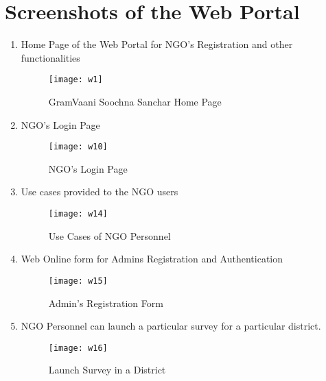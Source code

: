 \chapter{Screenshots of the Web Portal}

\begin{enumerate}
\item Home Page of the Web Portal for NGO's Registration and other functionalities
\begin{figure}[here]
\begin{center}   
\texttt{[image: w1]}
\caption{GramVaani Soochna Sanchar Home Page}
\label{fig:w1}
\end{center}
\end{figure}


\item NGO's Login Page
\begin{figure}[here]
\begin{center}   
\texttt{[image: w10]}
\caption{NGO's Login Page}
\label{fig:w10}
\end{center}
\end{figure}



\item Use cases provided to the NGO users
\begin{figure}[here]
\begin{center}   
\texttt{[image: w14]}
\caption{Use Cases of NGO Personnel}
\label{fig:w14}
\end{center}
\end{figure}



\item Web Online form for Admins Registration and Authentication
\begin{figure}[here]
\begin{center}   
\texttt{[image: w15]}
\caption{Admin's Registration Form}
\label{fig:w15}
\end{center}
\end{figure}




\item NGO Personnel can launch a particular survey for a particular district.
\begin{figure}[here]
\begin{center}   
\texttt{[image: w16]}
\caption{Launch Survey in a District}
\label{fig:w16}
\end{center}
\end{figure}



\end{enumerate}
